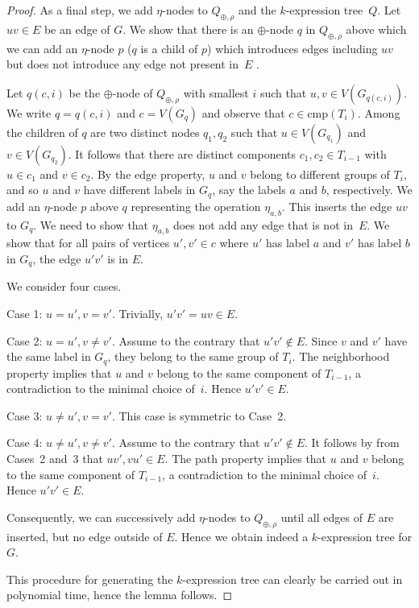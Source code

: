 \documentclass[10pt,usletter]{article}
\theoremstyle{remark}
\newcommand{\hy}{\hbox{-}\nobreak\hskip0pt}
\newcommand{\comps}{\text{cmp}}
\begin{document}
\begin{proof}
  As a final step, we add $\eta$\hy nodes to $Q_{\oplus,\rho}$ and the
  $k$\hy expression tree~$Q$. Let $uv\in E$ be an edge of $G$. We show
  that there is an $\oplus$\hy node $q$ in $Q_{\oplus,\rho}$ above
  which we can add an $\eta$\hy node $p$ ($q$ is a child of $p$) which
  introduces edges including $uv$ but does not introduce any edge not
  present in~$E$ .

  Let $q(c,i)$ be the $\oplus$\hy node of $Q_{\oplus,\rho}$ with
  smallest $i$ such that $u,v \in V(G_{q(c,i)})$. We write $q=q(c,i)$
  and $c=V(G_q)$ and observe that $c\in \comps(T_i)$.  Among the
  children of $q$ are two distinct nodes $q_1,q_2$ such that $u\in
  V(G_{q_1})$ and $v\in V(G_{q_2})$.  It follows that there are
  distinct components $c_1,c_2\in T_{i-1}$ with $u\in c_1$ and $v\in
  c_2$. By the edge property, $u$ and $v$ belong to different groups
  of $T_i$, and so $u$ and $v$ have different labels in $G_q$, say the
  labels $a$ and $b$, respectively.  We add an $\eta$\hy node $p$
  above $q$ representing the operation $\eta_{a,b}$. This inserts the
  edge $uv$ to $G_q$. We need to show that $\eta_{a,b}$ does not add
  any edge that is not in~$E$.  We show that for all pairs of vertices
  $u',v' \in c$ where $u'$ has label $a$ and $v'$ has label $b$ in
  $G_q$, the edge $u'v'$ is in $E$.

  We consider four cases.

  Case 1: $u=u', v =v'$. Trivially,  $u'v'=uv\in E$.

  Case 2: $u=u', v\neq v'$.   Assume to the contrary that
  $u'v'\notin E$. Since $v$ and $v'$ have the same label in
  $G_q$, they belong to the same group of $T_i$. The neighborhood
  property implies that $u$ and $v$ belong to the same component of
  $T_{i-1}$, a contradiction to the minimal choice of~$i$. Hence
  $u'v'\in E$.

  Case 3: $u\neq u', v= v'$. This case is symmetric to Case~2.
 
  Case 4: $u\neq u', v\neq v'$.  Assume to the contrary that $u'v'
  \notin E$.  It follows by from Cases~2 and~3 that $uv',vu'\in
  E$. The path property implies that $u$ and $v$ belong to the same
  component of $T_{i-1}$, a contradiction to the minimal choice
  of~$i$. Hence $u'v'\in E$.
  

  Consequently, we can successively add $\eta$\hy nodes to
  $Q_{\oplus,\rho}$ until all edges of $E$ are inserted, but no edge
  outside of $E$. Hence we obtain indeed a $k$\hy expression tree for
  $G$.

  This procedure for generating the $k$\hy expression tree can clearly
  be carried out in polynomial time, hence the lemma follows.
\end{proof}
\end{document}

